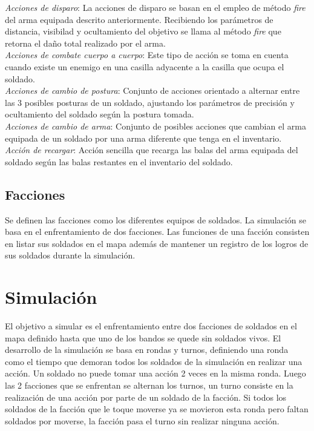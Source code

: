\documentclass[twoside]{article}
\begin{document}
\emph{Acciones de disparo}: La acciones de disparo se basan en el empleo de m\'etodo \emph{fire} del arma equipada descrito anteriormente. Recibiendo los par\'ametros de distancia, visibilad y ocultamiento del objetivo se llama al m\'etodo \emph{fire} que retorna el da\~no total realizado por el arma.\\
\emph{Acciones de combate cuerpo a cuerpo}: Este tipo de acci\'on se toma en cuenta cuando existe un enemigo en una casilla adyacente a la casilla que ocupa el soldado.\\

\emph{Acciones de cambio de postura}: Conjunto de acciones orientado a alternar entre las 3 posibles posturas de un soldado, ajustando los par\'ametros de precisi\'on y ocultamiento del soldado seg\'un la postura tomada.\\

\emph{Acciones de cambio de arma}: Conjunto de posibles acciones que cambian el arma equipada de un soldado por una arma diferente que tenga en el inventario.\\

\emph{Acci\'on de recargar}: Acci\'on sencilla que recarga las balas del arma equipada del soldado seg\'un las balas restantes en el inventario del soldado.

\section{Facciones}

Se definen las facciones como los diferentes equipos de soldados. La simulaci\'on se basa en el enfrentamiento de dos facciones. Las funciones de una facci\'on consisten en listar sus soldados en el mapa adem\'as de mantener un registro de los logros de sus soldados durante la simulaci\'on.


\chapter{Simulaci\'on}

El objetivo a simular es el enfrentamiento entre dos facciones de soldados en el mapa definido hasta que uno de los bandos se quede sin soldados vivos. El desarrollo de la simulaci\'on se basa en rondas y turnos, definiendo una ronda como el tiempo que demoran todos los soldados de la simulaci\'on en realizar una acci\'on. Un soldado no puede tomar una acci\'on 2 veces en la misma ronda. Luego las 2 facciones que se enfrentan se alternan los turnos, un turno consiste en la realizaci\'on de una acci\'on por parte de un soldado de la facci\'on. Si todos los soldados de la facci\'on que le toque moverse ya se movieron esta ronda pero faltan soldados por moverse, la facci\'on pasa el turno sin realizar ninguna acci\'on.
\end{document}
